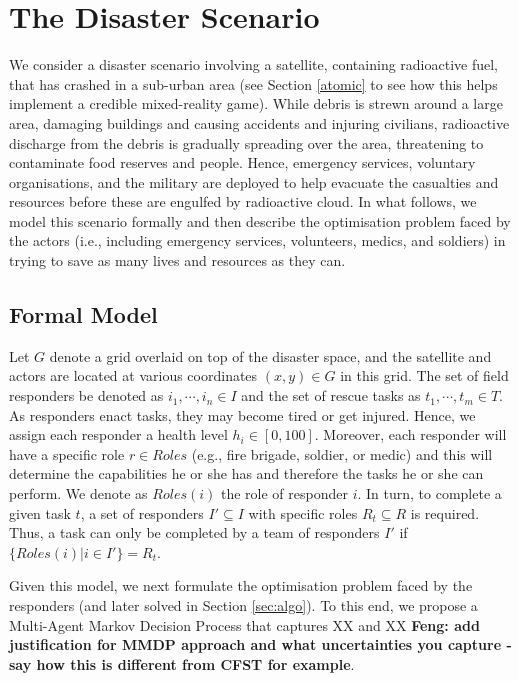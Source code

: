 \section{The Disaster Scenario}
\noindent We consider a disaster scenario involving a satellite, containing radioactive fuel, that has crashed in a sub-urban area (see Section \ref{atomic} to see how this helps implement a credible mixed-reality game). While debris is strewn around a large area, damaging buildings and causing accidents and injuring civilians, radioactive discharge from the debris is gradually spreading over the area, threatening to contaminate food reserves and people. Hence, emergency services, voluntary organisations, and the military are deployed to help evacuate the casualties and resources before these are engulfed by  radioactive cloud.  In what follows, we model this scenario formally and then describe the optimisation problem faced by the actors (i.e., including emergency services, volunteers, medics, and soldiers) in trying to save as many lives and resources as they can.

\subsection{Formal Model}
\noindent Let $G$ denote a grid overlaid on top of the disaster space, and the satellite and actors are located at various coordinates $(x,y) \in G$ in this grid. The set of field responders be denoted as $i_1, \cdots, i_n \in I$ and the set of rescue tasks as  $t_1,\cdots, t_m\in T$.  As responders enact tasks, they may become tired or get injured. Hence, we assign each responder  a health level $h_i\in [0,100]$. Moreover, each responder will have  a specific role  $r \in Roles$ (e.g., fire brigade, soldier, or medic) and this will determine the capabilities he or she has and therefore the tasks he or she can perform. We denote as $Roles(i)$ the role of responder $i$. In turn, to complete a given task $t$,  a set of responders $I' \subseteq I$ with specific roles $R_t \subseteq R$ is required. Thus, a task can only be completed by a team of responders $I'$ if $\{Roles(i) | i \in I'\} = R_t$. 

Given this model, we next formulate the optimisation problem faced by the responders (and later solved in Section \ref{sec:algo}). To this end, we propose a Multi-Agent Markov Decision Process that captures XX and XX \textbf{Feng: add justification for MMDP approach and what uncertainties you capture - say how this is different from CFST for example}.


